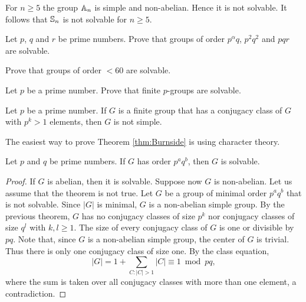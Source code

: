 \begin{example}
    For $n\geq5$ the group $\mathbb{A}_n$ is simple and non-abelian. Hence it 
    is not solvable. It follows that 
    $\mathbb{S}_n$ is not solvable for $n\geq5$. 
\end{example}

\begin{exercise}
\label{xca:Robinson:5.4.1}
    Let $p$, $q$ and $r$ be prime numbers. Prove that groups
    of order $p^\alpha q$, $p^2q^2$ and $pqr$ are solvable. 
\end{exercise}

\begin{exercise}
\label{xca:less60}
    Prove that groups of order $<60$ are solvable. 
\end{exercise}

\begin{exercise}
\label{xca:pgroups_solvable}
Let $p$ be a prime number. Prove that finite $p$-groups are solvable.
\end{exercise}

\begin{theorem}[Burnside]
        \label{thm:Burnside}
	Let $p$ be a prime number. If $G$ is a finite group that has 
        a conjugacy class of $G$ with $p^k>1$ elements, then $G$ 
	is not simple.
\end{theorem}

The easiest way to prove Theorem \ref{thm:Burnside}
is using character theory. 

\begin{theorem}[Burnside]
  Let $p$ and $q$ be prime numbers. If $G$ has order $p^aq^b$, then $G$ is solvable.
\end{theorem}

\begin{proof}
	If $G$ is abelian, then it is solvable.
	Suppose now $G$ is non-abelian.
	Let us assume that the theorem is not true. Let $G$ be a group
	of minimal order $p^aq^b$
	that is not solvable. Since $|G|$ is minimal, $G$ is a non-abelian simple group.
	By the previous theorem, 
	$G$ has no conjugacy classes of size $p^k$ nor 
	conjugacy classes of size $q^l$ with $k,l\geq1$. The size
	of every conjugacy class of $G$ is one or divisible by $pq$. 
	Note that, since $G$ is a non-abelian simple group,
	the center of $G$ is trivial.
	Thus there is only one conjugacy class of size one.
	By the class
	equation,
	\[
		|G|=1+\sum_{C:|C|>1}|C|\equiv 1 \bmod pq,
	\]
	where the sum is taken over all conjugacy classes 
	with more than one element, a contradiction.
\end{proof}

